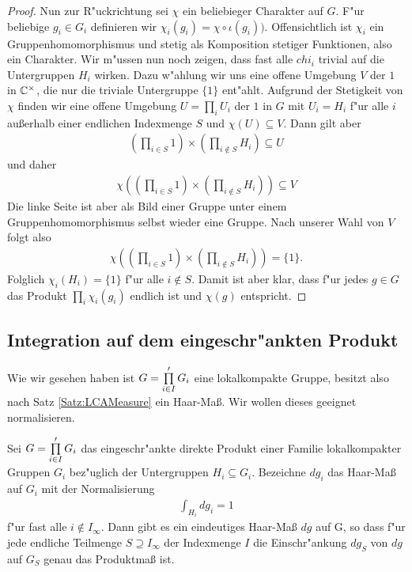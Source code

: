 \begin{proof}
			Nun zur R"uckrichtung sei $\chi$ ein beliebieger Charakter auf $G$. 
			F"ur beliebige $g_i \in G_i$ definieren wir $\chi_i (g_i) = \chi\circ\iota(g_i))$. 
			Offensichtlich ist $\chi_i$ ein Gruppenhomomorphismus und stetig als Komposition stetiger Funktionen, also ein Charakter. 
			Wir m"ussen nun noch zeigen, dass fast alle $chi_i$ trivial auf die Untergruppen $H_i$ wirken. 
			Dazu w"ahlung wir uns eine offene Umgebung $V$ der $1$ in $\mathbb{C}^\times$, die nur die triviale Untergruppe $\{1\}$ ent"ahlt. 
			Aufgrund der Stetigkeit von $\chi$ finden wir eine offene Umgebung $U=\prod_i U_i$ der $1$ in $G$ mit $U_i = H_i$ f"ur alle $i$ außerhalb einer endlichen Indexmenge $S$ und $\chi(U)\subseteq V$.
			Dann gilt aber
			\begin{align*}
				(\prod_{i \in S} 1) \times (\prod_{i \notin S} H_i) \subseteq U 
			\end{align*}
			und daher
			\begin{align*}
				\chi((\prod_{i \in S} 1) \times (\prod_{i \notin S} H_i)) \subseteq V 
			\end{align*}
			Die linke Seite ist aber als Bild einer Gruppe unter einem Gruppenhomomorphismus selbst wieder eine Gruppe. Nach unserer Wahl von $V$ folgt also
			\begin{align*}
				\chi((\prod_{i \in S} 1) \times (\prod_{i \notin S} H_i)) = \{1\}.
			\end{align*}
			Folglich $\chi_i (H_i) = \{1\}$ f"ur alle $i\notin S$. 
			Damit ist aber klar, dass f"ur jedes $g \in G$ das Produkt $\prod_i \chi_i(g_i)$ endlich ist und $\chi(g)$ entspricht.
		\end{proof}
	
	\subsection{Integration auf dem eingeschr"ankten Produkt}
		Wie wir gesehen haben ist $G=\prod\limits_{i \in I}' G_i$ eine lokalkompakte Gruppe, besitzt also nach Satz \ref{Satz:LCAMeasure} ein Haar-Maß. Wir wollen dieses geeignet normalisieren.
		\begin{satz}
			Sei $G=\prod\limits_{i \in I}' G_i$ das eingeschr"ankte direkte Produkt einer Familie lokalkompakter Gruppen $G_i$ bez"uglich der Untergruppen $H_i \subseteq G_i$. Bezeichne $dg_i$ das Haar-Maß auf $G_i$ mit der Normalisierung
			\begin{align*}
				\int_{H_i} dg_i = 1
			\end{align*}
			f"ur fast alle $i \notin I_\infty$. Dann gibt es ein eindeutiges Haar-Maß $dg$ auf G, so dass f"ur jede endliche Teilmenge $S\supseteq I_\infty$ der Indexmenge $I$ die Einschr"ankung $dg_S$ von $dg$ auf $G_S$ genau das Produktmaß ist.
		\end{satz}
		
